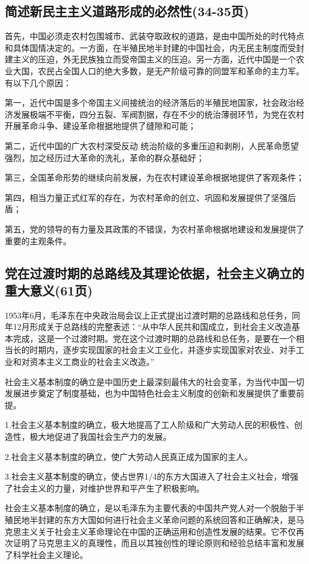 \documentclass[cn,11pt]{elegantbook}
\begin{document}
\subsection{简述新民主主义道路形成的必然性(34-35页)}
{\large
	首先，中国必须走农村包围城市、武装夺取政权的道路，是由中国所处的时代特点和具体国情决定的。{\heiti 一方面}，在半殖民地半封建的中国社会，内无民主制度而受封建主义的压迫，外无民族独立而受帝国主义的压迫。{\heiti 另一方面}，近代中国是一个农业大国，农民占全国人口的绝大多数，是无产阶级可靠的同盟军和革命的主力军。
	\\有以下几个原因：
	
	第一，近代中国是多个帝国主义间接统治的经济落后的半殖民地国家，社会政治经济发展极端不平衡，四分五裂、军阀割据，存在不少的统治薄弱环节，为党在农村开展革命斗争、建设革命根据地{\heiti 提供了缝隙和可能}；
	
	第二，近代中国的广大农村深受反动 统治阶级的多重压迫和剥削，人民革命愿望强烈，加之经历过大革命的洗礼，{\heiti 革命的群众基础好}；
	
	第三，全国革命形势的继续向前发展，为在农村建设革命根据地提供了{\heiti 客观条件}；
	
	第四，相当力量正式红军的存在，为农村革命的创立、巩固和发展{\heiti 提供了坚强后盾}；
	
	第五，党的领导的有力量及其政策的不错误，为农村革命根据地建设和发展{\heiti 提供了重要的主观条件}。
	
	
 }
\subsection{党在过渡时期的总路线及其理论依据，社会主义确立的重大意义(61页)}
{\large 

1953年6月，毛泽东在中央政治局会议上正式提出过渡时期的总路线和总任务，同年12月形成关于总路线的完整表述：“从中华人民共和国成立，到社会主义改造基本完成，这是一个过渡时期。党在这个过渡时期的总路线和总任务，是要在一个相当长的时期内，逐步实现国家的社会主义工业化，并逐步实现国家对农业、对手工业和对资本主义工商业的社会主义改造。”

 社会主义基本制度的确立是中国历史上最深刻最伟大的社会变革，为当代中国一切发展进步奠定了制度基础，也为中国特色社会主义制度的创新和发展提供了重要前提。
 
 1.社会主义基本制度的确立，极大地提高了工人阶级和广大劳动人民的积极性、创造性，极大地促进了我国社会生产力的发展。
 
 2.社会主义基本制度的确立，使广大劳动人民真正成为国家的主人。
 
 3.社会主义基本制度的确立，使占世界1/4的东方大国进入了社会主义社会，增强了社会主义的力量，对维护世界和平产生了积极影响。
 
 社会主义基本制度的确立，是以毛泽东为主要代表的中国共产党人对一个脱胎于半殖民地半封建的东方大国如何进行社会主义革命问题的系统回答和正确解决，是马克思主义关于社会主义革命理论在中国的正确运用和创造性发展的结果。它不仅再次证明了马克思主义的真理性，而且以其独创性的理论原则和经验总结丰富和发展了科学社会主义理论。
 
}
\end{document}
